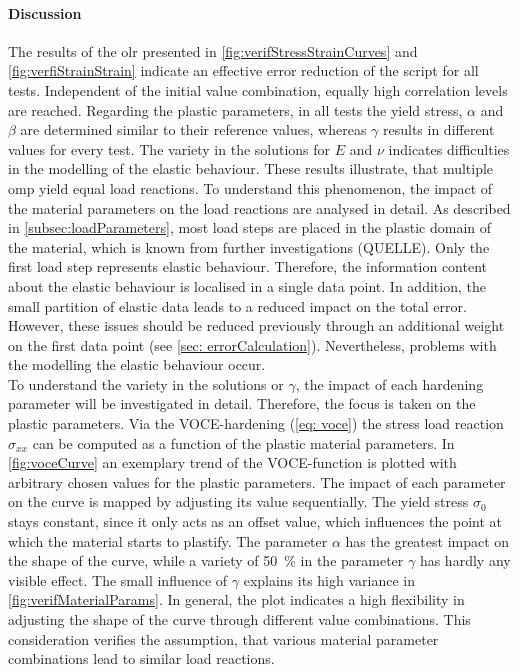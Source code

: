 \paragraph{Discussion}
The results of the \acrlong{olr} presented in \autoref{fig:verifStressStrainCurves} and \autoref{fig:verfiStrainStrain} indicate an effective error reduction of the script for all tests. Independent of the initial value combination, equally high correlation levels are reached. Regarding the plastic parameters, in all tests the yield stress, $\alpha$ and $\beta$ are determined similar to their reference values, whereas $\gamma$ results in different values for every test.  
The variety in the solutions for $E$ and $\nu$ indicates difficulties in the modelling of the elastic behaviour. 
These results illustrate, that multiple \acrlong{omp} yield equal load reactions. To understand this phenomenon, the impact of the material parameters on the load reactions are analysed in detail.
As described in \autoref{subsec:loadParameters}, most load steps are placed in the plastic domain of the material, which is known from further investigations (QUELLE).
Only the first load step represents elastic behaviour.
Therefore, the information content about the elastic behaviour is localised in a single data point.
In addition, the small partition of elastic data leads to a reduced impact on the total error.
However, these issues should be reduced previously through an additional weight on the first data point (see \autoref{sec: errorCalculation}).
Nevertheless, problems with the modelling the elastic behaviour occur. \\
\indent To understand the variety in the solutions or $\gamma$, the impact of each hardening parameter will be investigated in detail.
Therefore, the focus is taken on the plastic parameters. Via the VOCE-hardening (\autoref{eq: voce}) the stress load reaction $\sigma_{xx}$ can be computed as a function of the plastic material parameters.
In \autoref{fig:voceCurve} an exemplary trend of the VOCE-function is plotted with arbitrary chosen values for the plastic parameters. The impact of each parameter on the curve is mapped by adjusting its value sequentially. The yield stress $\sigma_0$ stays constant, since it only acts as an offset value, which influences the point at which the material starts to plastify. The parameter $\alpha$ has the greatest impact on the shape of the curve, while a variety of 50 \% in the parameter $\gamma$ has hardly any visible effect. The small influence of $\gamma$ explains its high variance in \autoref{fig:verifMaterialParams}. In general, the plot indicates a high flexibility in adjusting the shape of the curve through different value combinations. This consideration verifies the assumption, that various material parameter combinations lead to similar load reactions.

